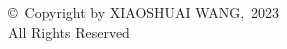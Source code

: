 
\thispagestyle{empty}
\addtocounter{page}{-1}
\vspace*{\fill}
\vfill
\begin{center}
\copyright\ Copyright by \MakeUppercase{Xiaoshuai Wang},~2023\\
All Rights Reserved
\end{center}
\clearpage